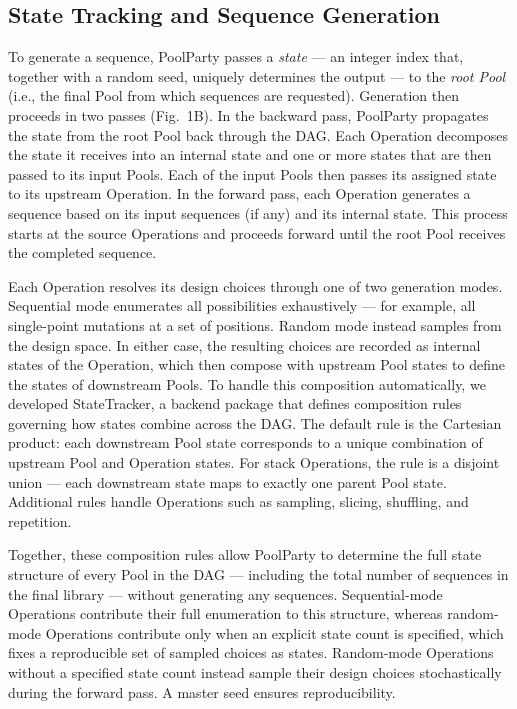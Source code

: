 \documentclass[unnumsec,webpdf,modern,large]{mam-authoring-template}%
\theoremstyle{thmstyleone}%
\theoremstyle{thmstyletwo}%
\theoremstyle{thmstylethree}%
\begin{document}
\subsection{State Tracking and Sequence Generation}

To generate a sequence, PoolParty passes a \emph{state} --- an integer index that, together with a random seed, uniquely determines the output --- to the \emph{root Pool} (i.e., the final Pool from which sequences are requested). Generation then proceeds in two passes (Fig.~1B). In the backward pass, PoolParty propagates the state from the root Pool back through the DAG. Each Operation decomposes the state it receives into an internal state and one or more states that are then passed to its input Pools. Each of the input Pools then passes its assigned state to its upstream Operation. In the forward pass, each Operation generates a sequence based on its input sequences (if any) and its internal state. This process starts at the source Operations and proceeds forward until the root Pool receives the completed sequence.


Each Operation resolves its design choices through one of two generation modes. Sequential mode enumerates all possibilities exhaustively --- for example, all single-point mutations at a set of positions. Random mode instead samples from the design space. In either case, the resulting choices are recorded as internal states of the Operation, which then compose with upstream Pool states to define the states of downstream Pools. To handle this composition automatically, we developed StateTracker, a backend package that defines composition rules governing how states combine across the DAG. The default rule is the Cartesian product: each downstream Pool state corresponds to a unique combination of upstream Pool and Operation states. For stack Operations, the rule is a disjoint union --- each downstream state maps to exactly one parent Pool state. Additional rules handle Operations such as sampling, slicing, shuffling, and repetition.

Together, these composition rules allow PoolParty to determine the full state structure of every Pool in the DAG --- including the total number of sequences in the final library --- without generating any sequences. Sequential-mode Operations contribute their full enumeration to this structure, whereas random-mode Operations contribute only when an explicit state count is specified, which fixes a reproducible set of sampled choices as states. Random-mode Operations without a specified state count instead sample their design choices stochastically during the forward pass. A master seed ensures reproducibility.
\end{document}
